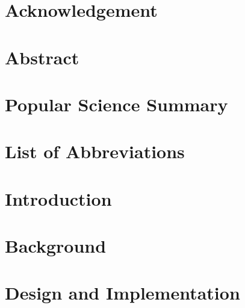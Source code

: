 \documentclass[11pt,twoside,final]{eitExjobb}  %
\begin{document}

\MakeTitlePage  %
\frontmatter    %

\chapter*{Acknowledgement}

\chapter*{Abstract}


\chapter*{Popular Science Summary}

\tableofcontents
\chapter*{List of Abbreviations}


\listoffigures
\listoftables
\cleardoublepage
\mainmatter

\chapter{Introduction}


\chapter{Background}


\chapter{Design and Implementation}

\end{document}
